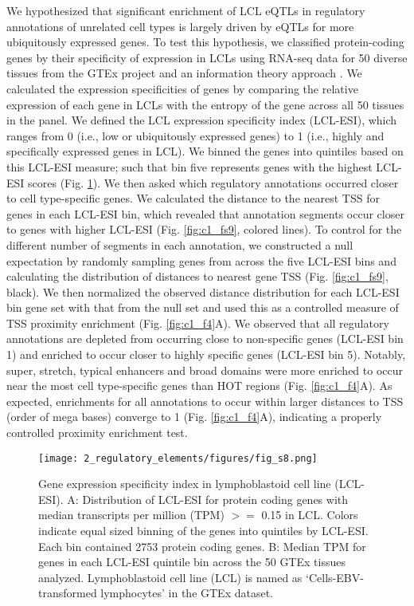 We hypothesized that significant enrichment of LCL eQTLs in regulatory annotations of unrelated cell types is largely driven by eQTLs for more ubiquitously expressed genes. To test this hypothesis, we classified protein-coding genes by their specificity of expression in LCLs using RNA-seq data for 50 diverse tissues from the GTEx project \cite{gtexconsortiumGeneticEffectsGene2017} and an information theory approach \cite{schugPromoterFeaturesRelated2005, heGlobalViewEnhancer2014, scottGeneticRegulatorySignature2016, varshneyGeneticRegulatorySignatures2017}. We calculated the expression specificities of genes by comparing the relative expression of each gene in LCLs with the entropy of the gene across all 50 tissues in the panel. We defined the LCL expression specificity index (LCL-ESI), which ranges from 0 (i.e., low or ubiquitously expressed genes) to 1 (i.e., highly and specifically expressed genes in LCL). We binned the genes into quintiles based on this LCL-ESI measure; such that bin five represents genes with the highest LCL-ESI scores (Fig. \ref{fig:c1_fs8}). We then asked which regulatory annotations occurred closer to cell type-specific genes. We calculated the distance to the nearest TSS for genes in each LCL-ESI bin, which revealed that annotation segments occur closer to genes with higher LCL-ESI (Fig. \ref{fig:c1_fs9}, colored lines). To control for the different number of segments in each annotation, we constructed a null expectation by randomly sampling genes from across the five LCL-ESI bins and calculating the distribution of distances to nearest gene TSS (Fig. \ref{fig:c1_fs9}, black). We then normalized the observed distance distribution for each LCL-ESI bin gene set with that from the null set and used this as a controlled measure of TSS proximity enrichment (Fig. \ref{fig:c1_f4}A). We observed that all regulatory annotations are depleted from occurring close to non-specific genes (LCL-ESI bin 1) and enriched to occur closer to highly specific genes (LCL-ESI bin 5). Notably, super, stretch, typical enhancers and broad domains were more enriched to occur near the most cell type-specific genes than HOT regions (Fig. \ref{fig:c1_f4}A). As expected, enrichments for all annotations to occur within larger distances to TSS (order of mega bases) converge to 1 (Fig. \ref{fig:c1_f4}A), indicating a properly controlled proximity enrichment test. \\

\begin{figure}
    \centering
    \texttt{[image: 2\_regulatory\_elements/figures/fig\_s8.png]}
    \caption[Gene expression specificity index in lymphoblastoid cell line (LCL-ESI)]{Gene expression specificity index in lymphoblastoid cell line (LCL-ESI). A: Distribution of LCL-ESI for protein coding genes with median transcripts per million (TPM) $>=$ 0.15 in LCL. Colors indicate equal sized binning of the genes into quintiles by LCL-ESI. Each bin contained 2753 protein coding genes. B: Median TPM for genes in each LCL-ESI quintile bin across the 50 GTEx tissues analyzed. Lymphoblastoid cell line (LCL) is named as ‘Cells-EBV-transformed lymphocytes’ in the GTEx dataset.}
    \label{fig:c1_fs8}
\end{figure}

